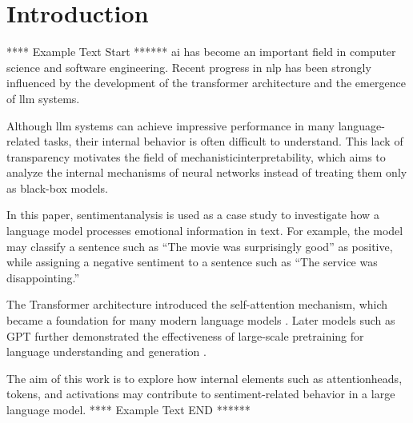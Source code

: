 \section{Introduction}

**** Example Text Start ******
\gls{ai} has become an important field in computer science and software engineering. 
Recent progress in \gls{nlp} has been strongly influenced by the development of the 
\gls{transformer} architecture and the emergence of \gls{llm} systems.

Although \gls{llm} systems can achieve impressive performance in many language-related tasks, 
their internal behavior is often difficult to understand. This lack of transparency motivates 
the field of \gls{mechanisticinterpretability}, which aims to analyze the internal mechanisms 
of neural networks instead of treating them only as black-box models.

In this paper, \gls{sentimentanalysis} is used as a case study to investigate how a language 
model processes emotional information in text. For example, the model may classify a sentence 
such as ``The movie was surprisingly good'' as positive, while assigning a negative sentiment 
to a sentence such as ``The service was disappointing.''

The Transformer architecture introduced the self-attention mechanism, which became a foundation 
for many modern language models \cite{vaswani2017attention}. Later models such as GPT further 
demonstrated the effectiveness of large-scale pretraining for language understanding and generation 
\cite{radford2018improving}.

The aim of this work is to explore how internal elements such as \glspl{attentionhead}, 
\glspl{token}, and \glspl{activation} may contribute to sentiment-related behavior in a 
large language model.
**** Example Text END ******